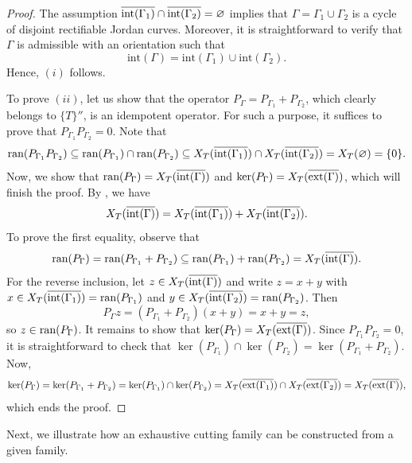 \documentclass[11pt]{amsart}
\theoremstyle{definition}
\theoremstyle{remark}
\numberwithin{equation}{section}
\newcommand{\ran}{\textnormal{ran}}
\newcommand{\biconm}[1]{{\{#1\}''}}
\newcommand{\inte}{\textnormal{int}}
\newcommand{\exte}{\textnormal{ext}}
\begin{document}
\begin{proof}
The assumption $\overline{\inte(\Gamma_1)}\cap \overline{\inte(\Gamma_2)}=\varnothing$ implies that $\Gamma = \Gamma_1\cup \Gamma_2$ is a cycle of disjoint rectifiable Jordan curves. Moreover, it is straightforward to verify that $\Gamma$ is admissible with an orientation  such that
$$
\mathrm{int}(\Gamma)=\mathrm{int}(\Gamma_1)\cup \mathrm{int}(\Gamma_2).
$$
Hence, $(i)$ follows.

\smallskip

To prove $(ii)$, let us show that the operator $P_\Gamma = P_{\Gamma_1}+P_{\Gamma_2}$, which clearly belongs to $\biconm{T}$, is an idempotent operator. For such a purpose, it suffices to prove that $P_{\Gamma_1}{P_{\Gamma_2}}= 0$. Note that
$$
\ran(P_{\Gamma_1}P_{\Gamma_2}) \subseteq   \ran(P_{\Gamma_1})\cap\ran(P_{\Gamma_2}) \subseteq   X_T(\overline{\inte(\Gamma_1)})\cap X_T(\overline{\inte(\Gamma_2)}) = X_T(\varnothing) = \{0\}.
$$
Now, we show that $\ran(P_\Gamma) =  X_T(\overline{\inte(\Gamma)})$ and $\ker(P_\Gamma) = X_T(\overline{\exte(\Gamma)})$, which will finish the proof.
By \cite[Proposition 1.2.16]{LN00}, we have
 $$
 X_T(\overline{\inte(\Gamma)}) = X_T(\overline{\inte(\Gamma_1)})+X_T(\overline{\inte(\Gamma_2)}).
 $$
 To prove the first equality, observe that
$$
\ran(P_\Gamma) = \ran(P_{\Gamma_1}+P_{\Gamma_2}) \subseteq   \ran(P_{\Gamma_1})+\ran(P_{\Gamma_2}) = X_T(\overline{\inte(\Gamma)}).
$$
For the reverse inclusion, let $z\in X_T(\overline{\inte(\Gamma)})$ and write $z=x+y$ with $x\in X_T(\overline{\inte(\Gamma_1)})=\ran(P_{\Gamma_1})$ and $y\in X_T(\overline{\inte(\Gamma_2)})=\ran(P_{\Gamma_2})$. Then
$$P_\Gamma z = (P_{\Gamma_1}+P_{\Gamma_2})(x+y) = x+y = z,$$ so $z\in \ran(P_\Gamma)$. It remains to show that $\ker(P_\Gamma) = X_T(\overline{\exte(\Gamma)})$. Since $P_{\Gamma_1}{P_{\Gamma_2}}= 0$, it is straightforward to check that $\ker(P_{\Gamma_1})\cap\ker(P_{\Gamma_2}) = \ker(P_{\Gamma_1}+P_{\Gamma_2})$. Now,
$$\ker(P_\Gamma)=\ker(P_{\Gamma_1}+P_{\Gamma_2}) = \ker(P_{\Gamma_1})\cap\ker(P_{\Gamma_2}) = X_T(\overline{\exte(\Gamma_1)})\cap X_T(\overline{\exte(\Gamma_2)}) = X_T(\overline{\exte(\Gamma)}), $$
which ends the proof.
\end{proof}


Next, we illustrate how an exhaustive cutting family can be constructed from a given family.
\end{document}
